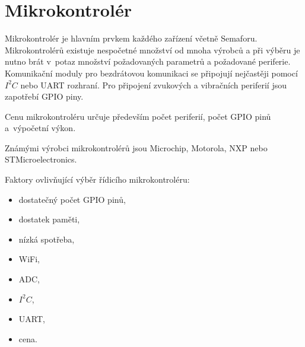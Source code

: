 \section{Mikrokontrolér}
Mikrokontrolér je hlavním prvkem každého zařízení včetně Semaforu. Mikrokontrolérů existuje nespočetné množství od mnoha výrobců a při výběru je nutno brát v~potaz
množství požadovaných parametrů a požadované periferie. 
Komunikační moduly pro bezdrátovou komunikaci se připojují nejčastěji pomocí $I^2C$ nebo UART rozhraní. Pro připojení zvukových a vibračních periferií jsou zapotřebí 
GPIO piny.

Cenu mikrokontroléru určuje především počet periferií, počet GPIO pinů a~výpočetní výkon.

Známými výrobci mikrokontrolérů jsou Microchip, Motorola, NXP nebo \\STMicroelectronics. 

\newpage
Faktory ovlivňující výběr řídicího mikrokontroléru:
\begin{itemize}
  \item dostatečný počet GPIO pinů,
  \item dostatek paměti,
  \item nízká spotřeba,
  \item WiFi,
  \item ADC,
  \item $I^2C$,
  \item UART,
  \item cena.
\end{itemize}







